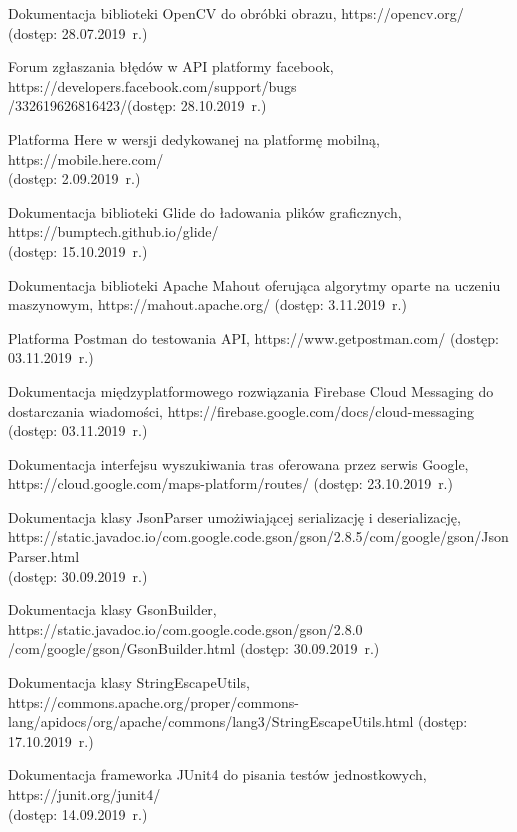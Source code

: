 \begin{thebibliography}{3}
   Dokumentacja biblioteki OpenCV do obróbki obrazu, https://opencv.org/ (dostęp: 28.07.2019~r.)
  
   Forum zgłaszania błędów w API platformy facebook, https://developers.facebook.com/support/bugs\\/332619626816423/(dostęp: 28.10.2019~r.)
  
   Platforma Here w wersji dedykowanej na platformę mobilną, https://mobile.here.com/ \\(dostęp: 2.09.2019~r.)
  
   Dokumentacja biblioteki Glide do ładowania plików graficznych, https://bumptech.github.io/glide/ \\(dostęp: 15.10.2019~r.)
  
   Dokumentacja biblioteki Apache Mahout oferująca algorytmy oparte na uczeniu maszynowym, https://mahout.apache.org/ (dostęp: 3.11.2019~r.)
  
   Platforma Postman do testowania API, https://www.getpostman.com/ (dostęp: 03.11.2019~r.)
  
   Dokumentacja międzyplatformowego rozwiązania Firebase Cloud Messaging do dostarczania wiadomości, https://firebase.google.com/docs/cloud-messaging (dostęp: 03.11.2019~r.)
  
   Dokumentacja interfejsu wyszukiwania tras oferowana przez serwis Google, https://cloud.google.com/maps-platform/routes/ (dostęp: 23.10.2019~r.)

   Dokumentacja klasy JsonParser umożiwiającej serializację i deserializację, https://static.javadoc.io/com.google.code.gson/gson/2.8.5/com/google/gson/JsonParser.html \\(dostęp: 30.09.2019~r.)

   Dokumentacja klasy GsonBuilder, https://static.javadoc.io/com.google.code.gson/gson/2.8.0\\/com/google/gson/GsonBuilder.html (dostęp: 30.09.2019~r.)

   Dokumentacja klasy StringEscapeUtils, https://commons.apache.org/proper/commons-lang/apidocs/org/apache/commons/lang3/StringEscapeUtils.html (dostęp: 17.10.2019~r.)
  
   Dokumentacja frameworka JUnit4 do pisania testów jednostkowych, https://junit.org/junit4/ \\(dostęp: 14.09.2019~r.)
  

\end{thebibliography}
